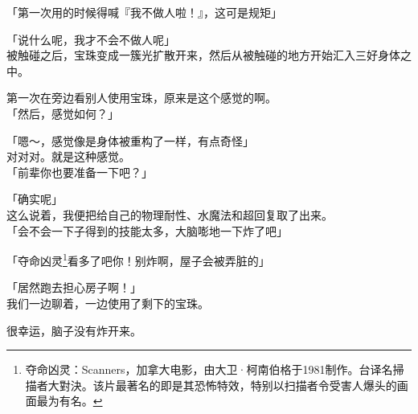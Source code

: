 「第一次用的时候得喊『我不做人啦！』，这可是规矩」

「说什么呢，我才不会不做人呢」\\

被触碰之后，宝珠变成一簇光扩散开来，然后从被触碰的地方开始汇入三好身体之中。

第一次在旁边看别人使用宝珠，原来是这个感觉的啊。\\

「然后，感觉如何？」

「嗯～，感觉像是身体被重构了一样，有点奇怪」\\

对对对。就是这种感觉。\\

「前辈你也要准备一下吧？」

「确实呢」\\

这么说着，我便把给自己的物理耐性、水魔法和超回复取了出来。\\

「会不会一下子得到的技能太多，大脑嘭地一下炸了吧」

「夺命凶灵\footnote{夺命凶灵：Scanners，加拿大电影，由大卫·柯南伯格于1981制作。台译名掃描者大對決。该片最著名的即是其恐怖特效，特别以扫描者令受害人爆头的画面最为有名。}看多了吧你！别炸啊，屋子会被弄脏的」

「居然跑去担心房子啊！」\\

我们一边聊着，一边使用了剩下的宝珠。

很幸运，脑子没有炸开来。\\

